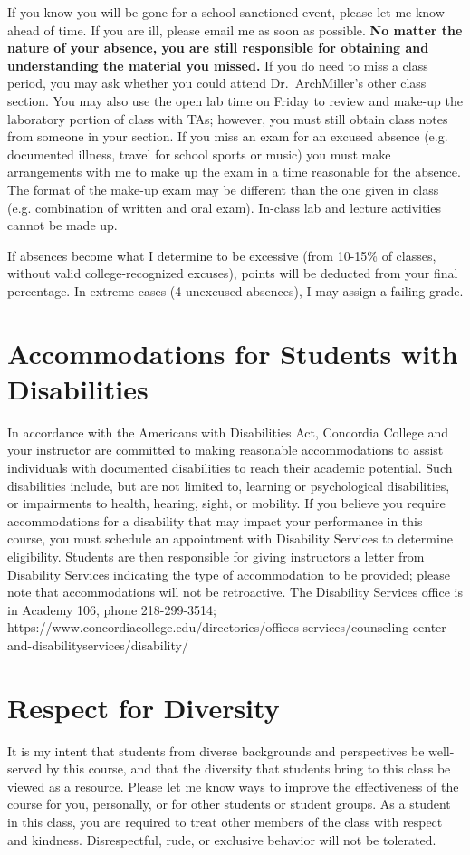 \documentclass{tufte-handout}
\begin{document}
\begin{fullwidth}
If you know you will be gone for a school sanctioned event, please let me know ahead of time. If you are ill, please email me as soon as possible. \textbf{No matter the nature of your absence, you are still responsible for obtaining and understanding the material you missed.} If you do need to miss a class period, you may ask whether you could attend Dr.\ ArchMiller's other class section. You may also use the open lab time on Friday to review and make-up the laboratory portion of class with TAs; however, you must still obtain class notes from someone in your section.  If you miss an exam for an excused absence (e.g. documented illness, travel for school sports or music) you must make arrangements with me to make up the exam in a time reasonable for the absence. The format of the make-up exam may be different than the one given in class (e.g. combination of written and oral exam). In-class lab and lecture activities cannot be made up.

If absences become what I determine to be excessive (from 10-15\% of classes, without valid college-recognized excuses), points will be deducted from your final percentage. In extreme cases (4 unexcused absences), I may assign a failing grade. 

\section{Accommodations for Students with Disabilities}

In accordance with the Americans with Disabilities Act, Concordia College and your instructor are committed to making reasonable accommodations to assist individuals with documented disabilities to reach their academic potential. Such disabilities include, but are not limited to, learning or psychological disabilities, or impairments to health, hearing, sight, or mobility. If you believe you require accommodations for a disability that may impact your performance in this course, you must schedule an appointment with Disability Services to determine eligibility. Students are then responsible for giving instructors a letter from Disability Services indicating the type of accommodation to be provided; please note that accommodations will not be retroactive. The Disability Services office is in Academy 106, phone 218-299-3514; https://www.concordiacollege.edu/directories/offices-services/counseling-center-and-disabilityservices/disability/ 

\section{Respect for Diversity}

It is my intent that students from diverse backgrounds and perspectives be well-served by this course, and that the diversity that students bring to this class be viewed as a resource. Please let me know ways to improve the effectiveness of the course for you, personally, or for other students or student groups. As a student in this class, you are required to treat other members of the class with respect and kindness. Disrespectful, rude, or exclusive behavior will not be tolerated.

\end{fullwidth}
\end{document}

